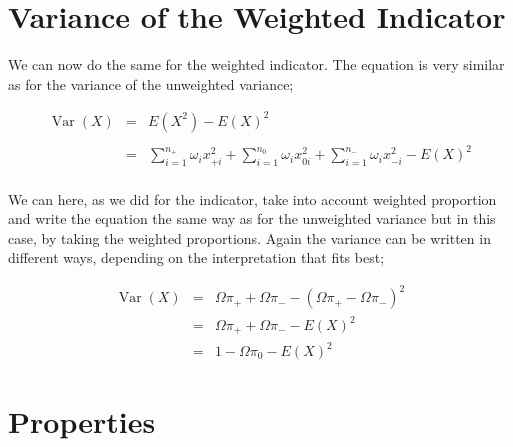 \documentclass[12pt,a4paper,oneside]{book}
\DeclareMathOperator{\Var}{Var}
\begin{document}
\section{Variance of the Weighted Indicator}

We can now do the same for the weighted indicator. The equation is very similar as for the variance of the unweighted variance;



\begin{eqnarray}
\Var(X) &=&  E\left( X^2\right) - E\left( X\right)^2 \nonumber \\ \nonumber \\
    &=& \sum_{i=1}^{n_+} \omega_i x_{+i}^2 + \sum_{i=1}^{n_0} \omega_i x_{0i}^2  + \sum_{i=1}^{n_-} \omega_i x_{-i}^2 - E(X)^2 \nonumber \\
\end{eqnarray}

We can here, as we did for the indicator, take into account weighted proportion and write the equation the same way as for the unweighted variance but in this case, by taking the weighted proportions. Again the variance can be written in different ways, depending on the interpretation that fits best;

\begin{eqnarray}
\Var(X) &=& \Omega \pi_+ + \Omega \pi_- - ( \Omega \pi_+ - \Omega \pi_- )^2 \\
	&=& \Omega \pi_+ + \Omega \pi_- - E ( X )^2 \\
	&=& 1 - \Omega \pi_{0} - E(X)^2 \label{eq:var3 weighted}
\end{eqnarray}


\section{Properties}
\end{document}
